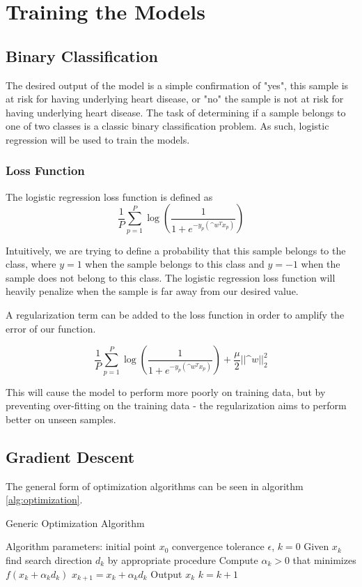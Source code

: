 \documentclass[12pt,conference]{IEEEtran}
\begin{document}
\section{Training the Models}
\subsection {Binary Classification}
The desired output of the model is a simple confirmation of "yes", this sample is at risk for having underlying heart disease, or "no" the sample is not at risk for having underlying heart disease. The task of determining if a sample belongs to one of two classes is a classic binary classification problem. As such, logistic regression will be used to train the models.
\subsubsection {Loss Function}
The logistic regression loss function is defined as
$$\frac{1}{P}\sum_{p=1}^{P} \log\left(\frac{1}{1+e^{-y_p(\^w^Tx_p)}}\right) $$

Intuitively, we are trying to define a probability that this sample belongs to the class, where $y = 1$ when the sample belongs to this class and $y = -1$ when the sample does not belong to this class. The logistic regression loss function will heavily penalize when the sample is far away from our desired value.

A regularization term can be added to the loss function in order to amplify the error of our function.

$$ \frac{1}{P}\sum_{p=1}^{P} \log\left(\frac{1}{1+e^{-y_p(\^w^Tx_p)}}\right) + \frac{\mu}{2}||\^w||_2^2$$

This will cause the model to perform more poorly on training data, but by preventing over-fitting on the training data - the regularization aims to perform better on unseen samples. 


\subsection {Gradient Descent}
The general form of optimization algorithms can be seen in algorithm \ref{alg:optimization}.
\begin{algorithm}
\caption{Generic Optimization Algorithm \cite{course-notes}}
\label{alg:optimization}
\begin{algorithmic}[1]
\State Algorithm parameters: initial point $x_0$
\State convergence tolerance $\epsilon$, $k = 0$
    \State Given $x_k$ find search direction $d_k$ by appropriate procedure
    \State Compute $\alpha_k > 0$ that minimizes $f(x_k + \alpha_kd_k)$
    \State $x_{k+1} = x_k + \alpha_kd_k$
        \State Output $x_k$
    \EndIf
    \State $k = k+1$
\EndWhile 
\end{algorithmic}
\end{algorithm}
\end{document}
